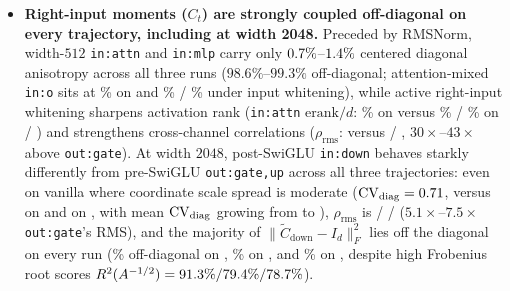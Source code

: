 \begin{itemize}
\item \textbf{Right-input moments ($C_t$) are strongly coupled off-diagonal on
  every trajectory, including at width 2048.} Preceded by RMSNorm, width-$512$
  \texttt{in:attn} and \texttt{in:mlp} carry only
  $0.7\%$--$1.4\%$ centered
  diagonal anisotropy across all three runs ($98.6\%$--$99.3\%$ off-diagonal;
  attention-mixed \texttt{in:o} sits at \motMuonInODiagAnisoMedPct\% on
   and \motInODiagAnisoMedPct\% / \motWtInODiagAnisoMedPct\% under
  input whitening), while active right-input whitening sharpens activation rank
  (\texttt{in:attn} $\mathrm{erank}/d$: \motMuonInAttnErankMedPct\% on
   versus \motInAttnErankMedPct\% / \motWtInAttnErankMedPct\% on
   / ) and strengthens cross-channel correlations
  ($\rho_{\mathrm{rms}}$: \motMuonInAttnCorrRmsMed{} versus
  \motInAttnCorrRmsMed{} / \motWtInAttnCorrRmsMed{}, $30\times$--$43\times$
  above \texttt{out:gate}). At width $2048$, post-SwiGLU \texttt{in:down}
  behaves starkly differently from pre-SwiGLU \texttt{out:gate,up} across all
  three trajectories: even on vanilla  where coordinate scale spread
  is moderate ($\mathrm{CV}_{\operatorname{diag}} = 0.71{}$, versus
  \motInDownDiagCvMed{} on  and \motWtInDownDiagCvMed{} on
  , with  mean $\mathrm{CV}_{\operatorname{diag}}$ growing from
  \motInDownEarlyCvMean{} to \motInDownFinalCvMean{}), $\rho_{\mathrm{rms}}$ is
  \motMuonInDownCorrRmsMed{} / \motInDownCorrRmsMed{} / \motWtInDownCorrRmsMed{}
  ($5.1\times$--$7.5\times$ \texttt{out:gate}'s RMS), and the majority of
  $\|\tilde C_{\text{down}}-I_d\|_F^2$ lies off the diagonal on every run
  (\motMuonInDownOffdiagAnisoMedPct\% off-diagonal on ,
  \motInDownOffdiagAnisoMedPct\% on , and
  \motWtInDownOffdiagAnisoMedPct\% on , despite high Frobenius
  root scores $R^2(A^{-1/2}) = 91.3\% /
  79.4\% / 78.7\%$).
\end{itemize}

